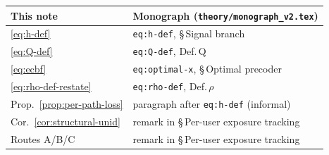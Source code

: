 \documentclass[11pt,a4paper]{article}
\theoremstyle{definition}
\begin{document}
\begin{center}
\small
\begin{tabular}{ll}
\toprule
This note & Monograph (\texttt{theory/monograph\_v2.tex}) \\
\midrule
\eqref{eq:h-def} & \texttt{eq:h-def}, \S\,Signal branch \\
\eqref{eq:Q-def} & \texttt{eq:Q-def}, Def.\,Q \\
\eqref{eq:ecbf} & \texttt{eq:optimal-x}, \S\,Optimal precoder \\
\eqref{eq:rho-def-restate} & \texttt{eq:rho-def}, Def.\,$\rho$ \\
Prop.~\ref{prop:per-path-loss} & paragraph after \texttt{eq:h-def} (informal) \\
Cor.~\ref{cor:structural-unid} & remark in \S\,Per-user exposure tracking \\
Routes A/B/C & remark in \S\,Per-user exposure tracking \\
\bottomrule
\end{tabular}
\end{center}
\end{document}
